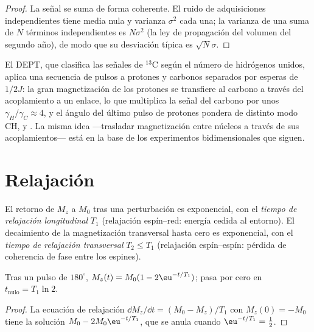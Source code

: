 \begin{proof}
La señal se suma de forma coherente. El ruido de adquisiciones independientes tiene
media nula y varianza $\sigma^2$ cada una; la varianza de una suma de $N$ términos independientes es
$N\sigma^2$ (la ley de propagación del volumen del segundo año), de modo que su desviación típica
es $\sqrt N\sigma$.
\end{proof}

El DEPT, que clasifica las señales de ${}^{13}$C según el número de hidrógenos unidos,
aplica una secuencia de pulsos a protones y carbonos separados por
esperas de $1/2J$: la gran magnetización de los protones se transfiere al carbono
a través del acoplamiento a un enlace, lo que multiplica la señal del carbono por unos
$\gamma_H/\gamma_C \approx 4$, y el ángulo del último pulso de protones pondera de distinto modo CH,  y
. La misma idea ---trasladar magnetización entre núcleos
a través de sus acoplamientos--- está en la base de los experimentos bidimensionales que siguen.

\section{Relajación}

\begin{definition}\label{def:b3:advanced-nmr:relaxation}
El retorno de $M_z$ a $M_0$ tras una perturbación es exponencial, con el
\emph{tiempo de relajación longitudinal} $T_1$
(relajación espín--red: energía cedida al entorno). El decaimiento de
la magnetización transversal hasta cero es exponencial, con el
\emph{tiempo de relajación transversal} $T_2 \le T_1$
(relajación espín--espín: pérdida de coherencia de fase entre los espines).
\end{definition}

\begin{proposition}\label{prop:b3:advanced-nmr:inversion-recovery}
Tras un pulso de $180^\circ$, $M_z(t) = M_0(1 - 2\eu^{-t/T_1})$; pasa por cero en
$t_{\mathrm{nulo}} = T_1\ln2$.
\end{proposition}

\begin{proof}
La ecuación de relajación $\dd M_z/\dd t = (M_0 - M_z)/T_1$ con $M_z(0) = -M_0$ tiene la
solución $M_0 - 2M_0\eu^{-t/T_1}$, que se anula cuando $\eu^{-t/T_1} = \frac12$.
\end{proof}

